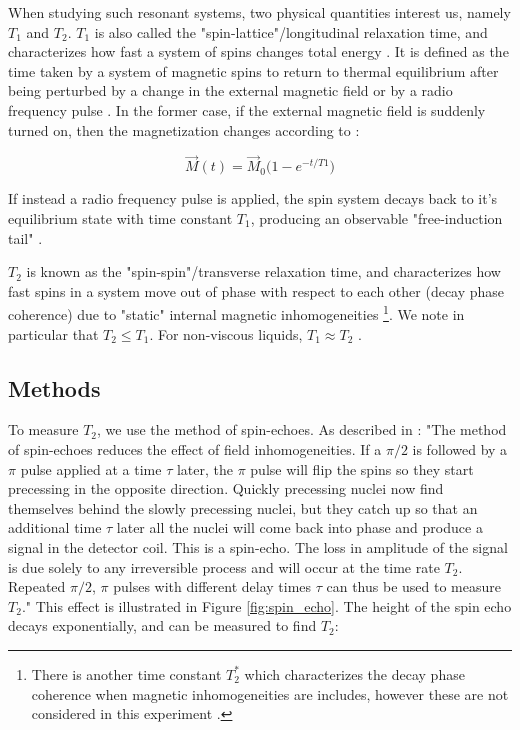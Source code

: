 \documentclass[a4paper, 12pt]{article}  %
\begin{document}
When studying such resonant systems, two physical quantities interest us, namely $T_1$ and $T_2$. $T_1$ is also called the "spin-lattice"/longitudinal relaxation time, and characterizes how fast a system of spins changes total energy \cite{Lab Manual}. It is defined as the time taken by a system of magnetic spins to return to thermal equilibrium after being perturbed by a change in the external magnetic field or by a radio frequency pulse \cite{Lab Manual}. In the former case, if the external magnetic field is suddenly turned on, then the magnetization changes according to  \cite{Lab Manual}: 

\begin{equation*}
    \Vec{M}(t) = \Vec{M}_0 \big ( 1 - e^{-t/T1} \big )
\end{equation*}

If instead a radio frequency pulse is applied, the spin system decays back to it's equilibrium state with time constant $T_1$, producing an observable "free-induction tail" \cite{Lab Manual}. 
\newline

$T_2$ is known as the "spin-spin"/transverse relaxation time, and characterizes how fast spins in a system move out of phase with respect to each other (decay phase coherence) due to "static" internal magnetic inhomogeneities \footnote{There is another time constant $T^*_2$ which characterizes the decay phase coherence when magnetic inhomogeneities are includes, however these are not considered in this experiment \cite{Lab Manual}.}\cite{Lab Manual}. We note in particular that $T_2 \leq T_1$. For non-viscous liquids, $T_1 \approx T_2$ \cite{Lab Manual}. 

\subsection{Methods}\label{Methods}

To measure $T_2$, we use the method of spin-echoes. As described in \cite{Lab Manual}:
"The method of spin-echoes reduces the effect of field inhomogeneities. If a $\pi/2$ is
followed by a $\pi$ pulse applied at a time $\tau$ later, the $\pi$ pulse will flip the spins so they start precessing in the opposite direction. Quickly precessing nuclei now find themselves behind the slowly precessing nuclei, but they catch up so that an additional time $\tau$ later all the nuclei will come back into phase and produce a signal in the detector coil. This is a spin-echo. The loss in
amplitude of the signal is due solely to any irreversible process and will occur at the time rate $T_2$. Repeated $\pi/2$, $\pi$ pulses with different delay times $\tau$ can thus be used to measure $T_2$." This effect is illustrated in Figure \ref{fig:spin_echo}. The height of the spin echo decays exponentially, and can be measured to find $T_2$:
\end{document}
